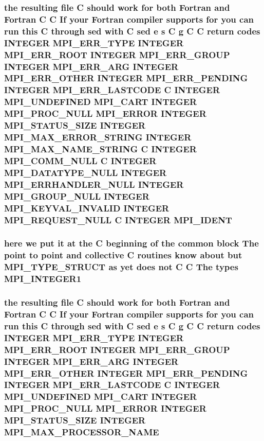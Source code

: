 \subsubsection{\setlength{\rightskip}{0pt plus 5cm}the resulting file C should {\bf work} for both Fortran and Fortran C C If your Fortran compiler supports for you can run this C through sed {\bf with} C sed e s C g C C return codes INTEGER MPI\_\-ERR\_\-TYPE INTEGER MPI\_\-ERR\_\-ROOT INTEGER MPI\_\-ERR\_\-GROUP INTEGER MPI\_\-ERR\_\-ARG INTEGER MPI\_\-ERR\_\-OTHER INTEGER MPI\_\-ERR\_\-PENDING INTEGER MPI\_\-ERR\_\-LASTCODE C INTEGER MPI\_\-UNDEFINED MPI\_\-CART INTEGER MPI\_\-PROC\_\-NULL MPI\_\-ERROR INTEGER MPI\_\-STATUS\_\-SIZE INTEGER MPI\_\-MAX\_\-ERROR\_\-STRING INTEGER MPI\_\-MAX\_\-NAME\_\-STRING C INTEGER MPI\_\-COMM\_\-NULL C INTEGER MPI\_\-DATATYPE\_\-NULL INTEGER MPI\_\-ERRHANDLER\_\-NULL INTEGER MPI\_\-GROUP\_\-NULL INTEGER MPI\_\-KEYVAL\_\-INVALID INTEGER MPI\_\-REQUEST\_\-NULL C INTEGER {\bf MPI\_\-IDENT}}\label{mpif_8h_320e8809198e6b813977fce7a0ff2ca5}


\subsubsection{\setlength{\rightskip}{0pt plus 5cm}here we put it at the C beginning of the common block The point to point and collective C routines know about but MPI\_\-TYPE\_\-STRUCT as yet does not C C The types {\bf MPI\_\-INTEGER1}}\label{mpif_8h_0aa8c24d6c103be23cd75b6cba7d9647}


\subsubsection{\setlength{\rightskip}{0pt plus 5cm}the resulting file C should {\bf work} for both Fortran and Fortran C C If your Fortran compiler supports for you can run this C through sed {\bf with} C sed e s C g C C return codes INTEGER MPI\_\-ERR\_\-TYPE INTEGER MPI\_\-ERR\_\-ROOT INTEGER MPI\_\-ERR\_\-GROUP INTEGER MPI\_\-ERR\_\-ARG INTEGER MPI\_\-ERR\_\-OTHER INTEGER MPI\_\-ERR\_\-PENDING INTEGER MPI\_\-ERR\_\-LASTCODE C INTEGER MPI\_\-UNDEFINED MPI\_\-CART INTEGER MPI\_\-PROC\_\-NULL MPI\_\-ERROR INTEGER MPI\_\-STATUS\_\-SIZE INTEGER {\bf MPI\_\-MAX\_\-PROCESSOR\_\-NAME}}\label{mpif_8h_6ce8a6afc4787c3cadc95172fb3097d9}


